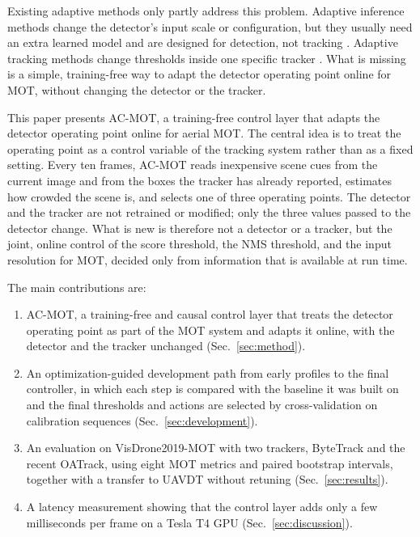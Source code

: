 \documentclass[journal]{new-aiaa}
\begin{document}
Existing adaptive methods only partly address this problem. Adaptive inference
methods change the detector's input scale or configuration, but they usually
need an extra learned model and are designed for detection, not tracking
\cite{chin2019adascale,xu2020approxdet}. Adaptive tracking methods change
thresholds inside one specific tracker \cite{ma2023adaptivebytetrack,shim2024adaptrack}.
What is missing is a simple, training-free way to adapt the detector
operating point online for MOT, without changing the detector or the tracker.

This paper presents AC-MOT, a training-free control layer that adapts the
detector operating point online for aerial MOT. The central idea is to treat
the operating point as a control variable of the tracking system rather than
as a fixed setting. Every ten frames, AC-MOT reads inexpensive scene cues from
the current image and from the boxes the tracker has already reported,
estimates how crowded the scene is, and selects one of three operating
points. The detector and the tracker are not retrained or modified; only the
three values passed to the detector change. What is new is therefore not a
detector or a tracker, but the joint, online control of the score threshold,
the NMS threshold, and the input resolution for MOT, decided only from
information that is available at run time.

The main contributions are:
\begin{enumerate}
\item AC-MOT, a training-free and causal control layer that treats the
      detector operating point as part of the MOT system and adapts it online,
      with the detector and the tracker unchanged (Sec.~\ref{sec:method}).
\item An optimization-guided development path from early profiles to the
      final controller, in which each step is compared with the baseline it
      was built on and the final thresholds and actions are selected by
      cross-validation on calibration sequences (Sec.~\ref{sec:development}).
\item An evaluation on VisDrone2019-MOT with two trackers, ByteTrack and the
      recent OATrack, using eight MOT metrics and paired bootstrap intervals,
      together with a transfer to UAVDT without retuning
      (Sec.~\ref{sec:results}).
\item A latency measurement showing that the control layer adds only a few
      milliseconds per frame on a Tesla T4 GPU (Sec.~\ref{sec:discussion}).
\end{enumerate}
\end{document}
